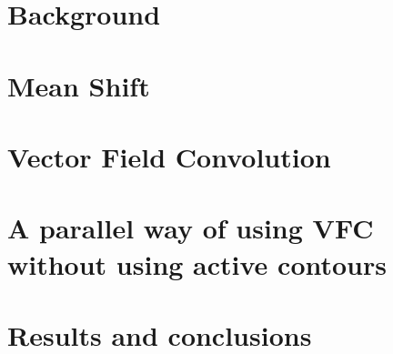 \documentclass[11pt,a4paper,twoside,openright,titlepage]{book}
\begin{document}
\frontmatter




\cleardoublepage
\setcounter{page}{1}

\cleardoublepage
\setcounter{page}{1}
\tableofcontents

\mainmatter


\part{Background}

\part{Mean Shift}

\part{Vector Field Convolution}

\part{A parallel way of using VFC without using active contours}

\part{Results and conclusions}


\backmatter

\listoffigures
\listoftables

\printbibliography[heading=bibintoc]
\end{document}
